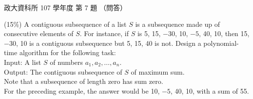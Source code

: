 \begin{pastexam}[label={px:nccu-107-dsa-07}]{政大資科所 107 學年度 第 7 題}
（問答）

(15\%) A contiguous subsequence of a list $S$ is a subsequence made up of consecutive elements of
$S$. For instance, if $S$ is 5, 15, $-30$, 10, $-5$, 40, 10, then 15, $-30$, 10 is a contiguous
subsequence but 5, 15, 40 is not. Design a polynomial-time algorithm for the following task:\\
Input: A list $S$ of numbers $a_1,a_2,\ldots,a_n$.\\
Output: The contiguous subsequence of $S$ of maximum sum.\\
Note that a subsequence of length zero has sum zero.\\
For the preceding example, the answer would be 10, $-5$, 40, 10, with a sum of 55.
\end{pastexam}

